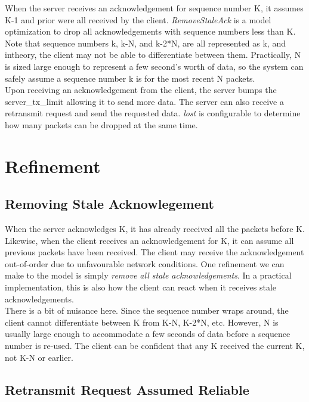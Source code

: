 When the server receives an acknowledgement for sequence number K, it assumes
K-1 and prior were all received by the client. \textit{RemoveStaleAck} is a
model optimization to drop all acknowledgements with sequence numbers less than
K. Note that sequence numbers k, k-N, and k-2*N, are all represented as k, and
intheory, the client may not be able to differentiate between them.
Practically, N is sized large enough to represent a few second's worth of data,
so the system can safely assume a sequence number k is for the most recent N
packets.\\

Upon receiving an acknowledgement from the client, the server bumps the
server\_tx\_limit allowing it to send more data. The server can also receive a 
retransmit request and send the requested data. \textit{lost} is configurable to
determine how many packets can be dropped at the same time.

\section{Refinement}

\subsection{Removing Stale Acknowlegement}

When the server acknowledges K, it has already received all the packets before
K. Likewise, when the client receives an acknowledgement for K, it can assume
all previous packets have been received. The client may receive the
acknowledgement out-of-order due to unfavourable network conditions. One
refinement we can make to the model is simply \textit{remove all stale
acknowledgements}. In a practical implementation, this is also how the client
can react when it receives stale acknowledgements.\\

There is a bit of nuisance here. Since the sequence number wraps around, the
client cannot differentiate between K from K-N, K-2*N, etc. However, N
is usually large enough to accommodate a few seconds of data before a sequence
number is re-used. The client can be confident that any K received the current
K, not K-N or earlier.

\subsection{Retransmit Request Assumed Reliable}

